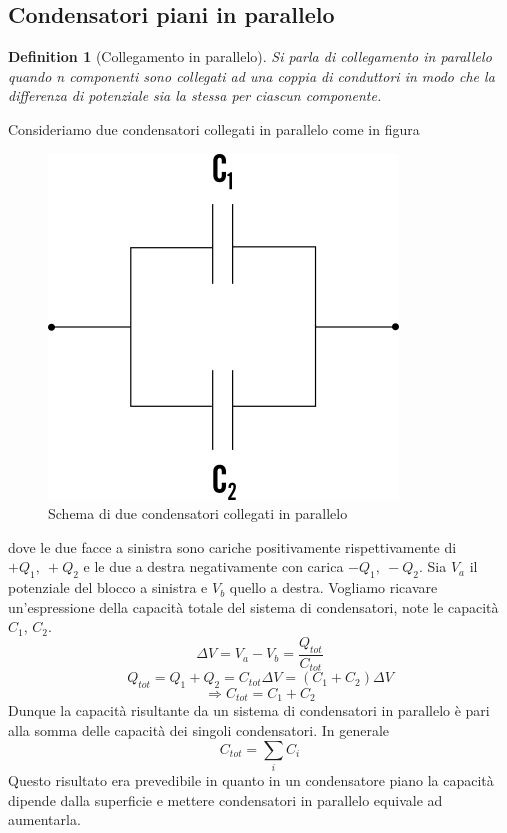 \documentclass[10pt,a4paper]{article}
\newtheorem{definition}{Definition}
\begin{document}
\subsection*{Condensatori piani in parallelo}
\begin{definition}[Collegamento in parallelo]
Si parla di collegamento in parallelo quando n componenti sono collegati ad una coppia di conduttori in modo che la differenza di potenziale sia la stessa per ciascun componente.
\end{definition}
Consideriamo due condensatori collegati in parallelo come in figura
\begin{figure}[h!]
	\centering
	\includegraphics[width=0.4\linewidth]{images/Condensatori_parallelo}
	\caption{Schema di due condensatori collegati in parallelo}
	\label{fig:condensatoriparallelo}
\end{figure}
\FloatBarrier
dove le due facce a sinistra sono cariche positivamente rispettivamente di \(+Q_1,\ +Q_2\) e le due a destra negativamente con carica \(-Q_1,\ -Q_2\). Sia \(V_a\) il potenziale del blocco a sinistra e \(V_b\) quello a destra. Vogliamo ricavare un'espressione della capacità totale del sistema di condensatori, note le capacità \(C_1\), \(C_2\). 
\[\Delta V = V_a - V_b = \frac{Q_{tot}}{C_{tot}}\] 
\[Q_{tot}=Q_1+Q_2=C_{tot}\Delta V = (C_1+C_2)\Delta V\]
\[\Rightarrow C_{tot} = C_1 +C_2\]
Dunque la capacità risultante da un sistema di condensatori in parallelo è pari alla somma delle capacità dei singoli condensatori. In generale
\[C_{tot} = \sum_i C_i\]
Questo risultato era prevedibile in quanto in un condensatore piano la capacità dipende dalla superficie e mettere condensatori in parallelo equivale ad aumentarla. 
\end{document}
